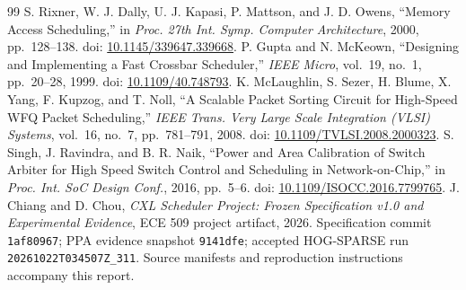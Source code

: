 \documentclass[10pt,letterpaper,twocolumn]{article}
\newcommand{\code}[1]{\texttt{#1}}
\begin{document}
\begin{thebibliography}{99}
 S. Rixner, W. J. Dally, U. J. Kapasi, P. Mattson, and J. D. Owens, ``Memory Access Scheduling,'' in \emph{Proc. 27th Int. Symp. Computer Architecture}, 2000, pp.~128--138. doi: \href{https://doi.org/10.1145/339647.339668}{10.1145/339647.339668}.
 P. Gupta and N. McKeown, ``Designing and Implementing a Fast Crossbar Scheduler,'' \emph{IEEE Micro}, vol.~19, no.~1, pp.~20--28, 1999. doi: \href{https://doi.org/10.1109/40.748793}{10.1109/40.748793}.
 K. McLaughlin, S. Sezer, H. Blume, X. Yang, F. Kupzog, and T. Noll, ``A Scalable Packet Sorting Circuit for High-Speed WFQ Packet Scheduling,'' \emph{IEEE Trans. Very Large Scale Integration (VLSI) Systems}, vol.~16, no.~7, pp.~781--791, 2008. doi: \href{https://doi.org/10.1109/TVLSI.2008.2000323}{10.1109/TVLSI.2008.2000323}.
 S. Singh, J. Ravindra, and B. R. Naik, ``Power and Area Calibration of Switch Arbiter for High Speed Switch Control and Scheduling in Network-on-Chip,'' in \emph{Proc. Int. SoC Design Conf.}, 2016, pp.~5--6. doi: \href{https://doi.org/10.1109/ISOCC.2016.7799765}{10.1109/ISOCC.2016.7799765}.
 J. Chiang and D. Chou, \emph{CXL Scheduler Project: Frozen Specification v1.0 and Experimental Evidence}, ECE 509 project artifact, 2026. Specification commit \code{1af80967}; PPA evidence snapshot \code{9141dfe}; accepted HOG-SPARSE run \code{20261022T034507Z\_311}. Source manifests and reproduction instructions accompany this report.
\end{thebibliography}
\endgroup
\end{document}
